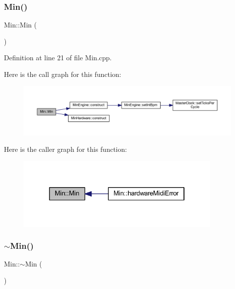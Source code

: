 \subsubsection{\texorpdfstring{Min()}{Min()}}
{\footnotesize\ttfamily Min\+::\+Min (\begin{DoxyParamCaption}{ }\end{DoxyParamCaption})}



Definition at line 21 of file Min.\+cpp.

Here is the call graph for this function\+:
\nopagebreak
\begin{figure}[H]
\begin{center}
\leavevmode
\includegraphics[width=350pt]{dd/d34/class_min_a136258f6eb36642c84deb93ab60be785_cgraph}
\end{center}
\end{figure}
Here is the caller graph for this function\+:
\nopagebreak
\begin{figure}[H]
\begin{center}
\leavevmode
\includegraphics[width=286pt]{dd/d34/class_min_a136258f6eb36642c84deb93ab60be785_icgraph}
\end{center}
\end{figure}
\mbox{\label{class_min_a53df82489feb20336ea097d190a8d8db}} 
\subsubsection{\texorpdfstring{$\sim$\+Min()}{~Min()}}
{\footnotesize\ttfamily Min\+::$\sim$\+Min (\begin{DoxyParamCaption}{ }\end{DoxyParamCaption})}



